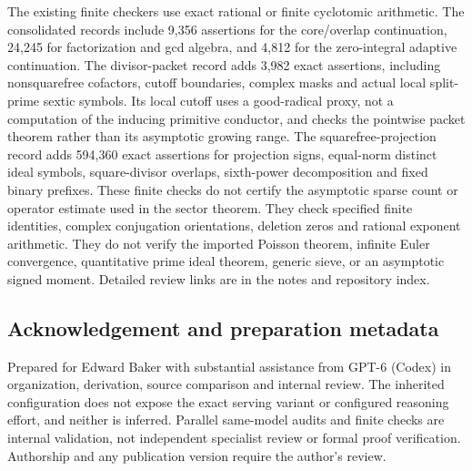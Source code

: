 \documentclass[11pt]{article}
\numberwithin{equation}{section}
\theoremstyle{definition}
\theoremstyle{remark}
\begin{document}
The existing finite checkers use exact rational or finite cyclotomic
arithmetic. The consolidated records include 9,356 assertions for
the core/overlap continuation, 24,245 for factorization and gcd
algebra, and 4,812 for the zero-integral adaptive continuation.
The divisor-packet record adds 3,982 exact assertions, including
nonsquarefree cofactors, cutoff boundaries, complex masks and actual
local split-prime sextic symbols. Its local cutoff uses a good-radical
proxy, not a computation of the inducing primitive conductor, and checks
the pointwise packet theorem rather than its asymptotic growing range.
The squarefree-projection record adds 594,360 exact assertions for
projection signs, equal-norm distinct ideal symbols, square-divisor
overlaps, sixth-power decomposition and fixed binary prefixes.
These finite checks do not certify the asymptotic sparse count or
operator estimate used in the sector theorem.
They check specified finite identities, complex conjugation
orientations, deletion zeros and rational exponent arithmetic.
They do not verify the imported Poisson theorem, infinite Euler
convergence, quantitative prime ideal theorem, generic sieve,
or an asymptotic signed moment. Detailed review links are in
the notes and repository index.

\subsection*{Acknowledgement and preparation metadata}

Prepared for Edward Baker with substantial assistance from GPT-6
(Codex) in organization, derivation, source comparison and internal
review. The inherited configuration does not expose the exact serving
variant or configured reasoning effort, and neither is inferred.
Parallel same-model audits and finite checks are internal validation,
not independent specialist review or formal proof verification.
Authorship and any publication version require the author's review.
\end{document}

